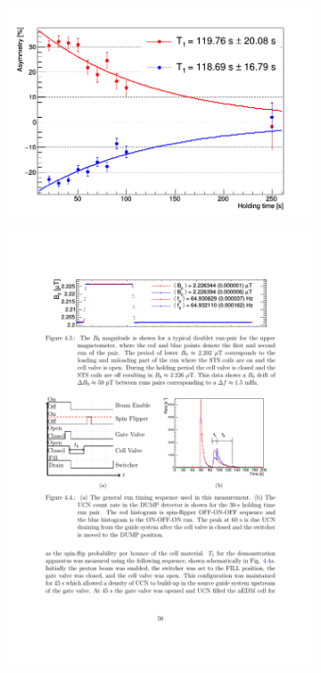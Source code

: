 \begin{figure}
\centering
\begin{subfigure}{.5\textwidth} 
  \centering
  \includegraphics[width=\textwidth]{figures/ramsey2017_t1.png}
  \vspace{8pt}
  \caption{}\label{subfig:ramsey2017_t1_asymmetry}
\end{subfigure}%
\begin{subfigure}{.5\textwidth}
  \centering
  \includegraphics[width=\textwidth]{figures/ramsey_2017_t1_measurement_pair.pdf}

\end{subfigure}
\end{figure}
